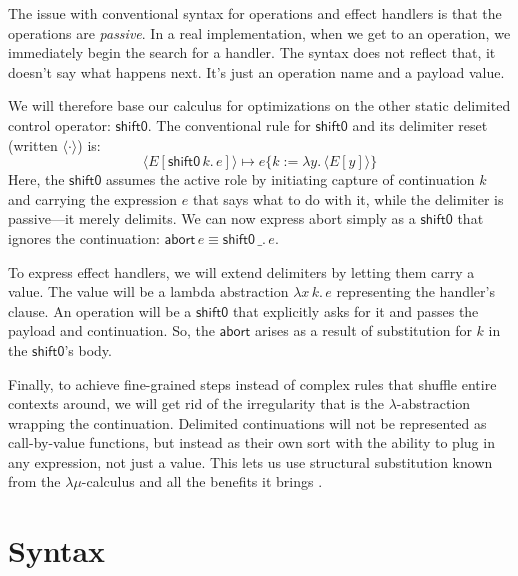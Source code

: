 \documentclass[a4paper, 11pt,titlepage, openright, twoside]{report}
\newcommand{\shiftz}{\textsf{shift0}}
\newcommand{\abort}{\textsf{abort}}
\newcommand{\subst}[2]{\{#1{:=}#2\}}
\newcommand{\+}{\enspace}
\begin{document}
The issue with conventional syntax for operations and effect handlers is that
the operations are \textit{passive}.
In a real implementation, when we get to an operation, we immediately begin the search for a handler.
The syntax does not reflect that, it doesn't say what happens next. It's just an operation name and a payload value.

We will therefore base our calculus for optimizations on the other static delimited control operator:
$\shiftz$. The conventional rule for $\shiftz$ and its delimiter \textsf{reset} (written $⟨·⟩$) is:
$$⟨E[\shiftz\,k.\,e]⟩ ↦ e\subst{k}{λy.\,⟨E[y]⟩}$$
Here, the $\shiftz$ assumes the active role by initiating capture of continuation $k$ and carrying the expression $e$ that says what to do with it,
while the delimiter is passive---it merely delimits.
We can now express \abort{} simply as a $\shiftz$ that ignores the continuation: $\textsf{abort}\,e ≡ \shiftz\,\_.\,e$.

To express effect handlers, we will extend delimiters by letting them carry a value.
The value will be a lambda abstraction $λx\,k.\,e$ representing the handler's clause.
An operation will be a $\shiftz$ that explicitly asks for it and passes the payload and continuation.
So, the $\abort$ arises as a result of substitution for $k$ in the $\shiftz$'s body.

Finally, to achieve fine-grained steps instead of complex rules that shuffle entire contexts around,
we will get rid of the irregularity that is the $λ$-abstraction wrapping the continuation.
Delimited continuations will not be represented as call-by-value functions, but instead
as their own sort with the ability to plug in any expression, not just a value.
This lets us use structural substitution known from the $λμ$-calculus and all the benefits it brings \cite{benefit}.

\chapter{Syntax}
\label{Syntax}
\end{document}
